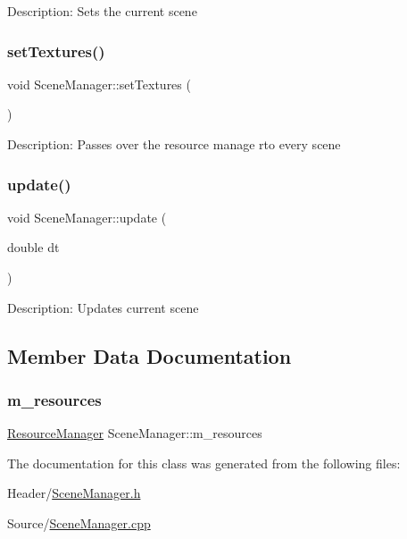 Description\+: Sets the current scene \mbox{\label{class_scene_manager_a8deb97f7f4c212314c66b96baf325cf5}} 
\subsubsection{\texorpdfstring{setTextures()}{setTextures()}}
{\footnotesize\ttfamily void Scene\+Manager\+::set\+Textures (\begin{DoxyParamCaption}{ }\end{DoxyParamCaption})}

Description\+: Passes over the resource manage rto every scene \mbox{\label{class_scene_manager_ac919b175f2a4b00c4f69e40ab43b1468}} 
\subsubsection{\texorpdfstring{update()}{update()}}
{\footnotesize\ttfamily void Scene\+Manager\+::update (\begin{DoxyParamCaption}\item[{double}]{dt }\end{DoxyParamCaption})}

Description\+: Updates current scene 

\subsection{Member Data Documentation}
\mbox{\label{class_scene_manager_a27175bd685421567da69acbd44484e73}} 
\subsubsection{\texorpdfstring{m\_resources}{m\_resources}}
{\footnotesize\ttfamily \mbox{\hyperlink{class_resource_manager}{Resource\+Manager}} Scene\+Manager\+::m\+\_\+resources}



The documentation for this class was generated from the following files\+:\begin{DoxyCompactItemize}
\item 
Header/\mbox{\hyperlink{_scene_manager_8h}{Scene\+Manager.\+h}}\item 
Source/\mbox{\hyperlink{_scene_manager_8cpp}{Scene\+Manager.\+cpp}}\end{DoxyCompactItemize}
